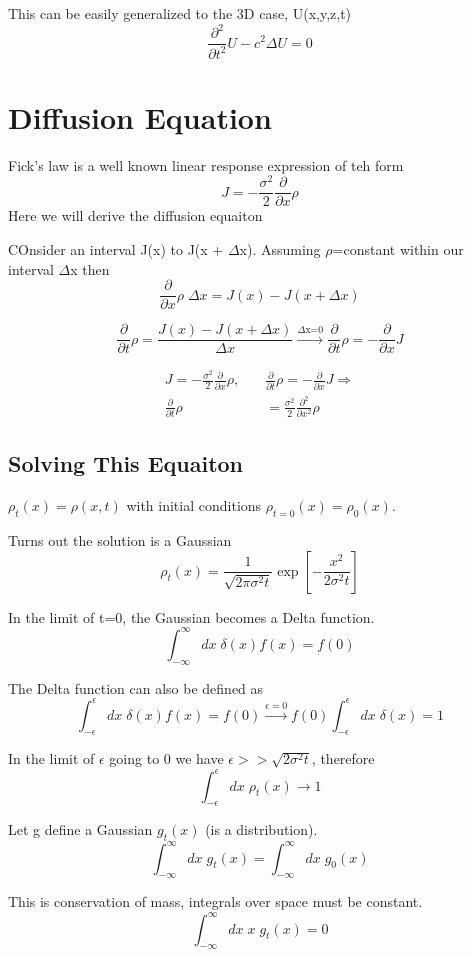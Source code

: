 \documentclass{article}
\newcommand{\be}{\begin{equation}}
\newcommand{\ee}{\end{equation}}
\newcommand{\pd}{\partial}
\newcommand{\ii}{\int_{-\infty}^\infty}
\newcommand{\prt}{\frac{\pd}{\pd t}}
\newcommand{\prts}{\frac{\pd^2}{\pd t^2}}
\newcommand{\prx}{\frac{\pd}{\pd x}}
\newcommand{\prxs}{\frac{\pd^2}{\pd x^2}}
\begin{document}
This can be easily generalized to the 3D case, U(x,y,z,t)
\be
\prts U - c^2 \Delta U = 0
\ee


\section{Diffusion Equation}
Fick's law is a well known linear response expression of teh form
\be
J = -\frac{\sigma^2}{2}\prx \rho
\ee
Here we will derive the diffusion equaiton

COnsider an interval J(x) to J(x + $\Delta$x).
Assuming $\rho$=constant within our interval $\Delta$x then
\be
\prx \rho\; \Delta x = J(x) - J(x+\Delta x)
\ee

\be
\prt \rho = \frac{J(x) - J(x+\Delta x)}{\Delta x} \xrightarrow{\text{$\Delta$x=0}} \prt \rho= -\prx J
\ee

\be
\begin{split}
    J = -\frac{\sigma^2}{2}\prx \rho, \quad&  \prt \rho= -\prx J \Rightarrow \\
    \prt \rho &= \frac{\sigma^2}{2}\prxs \rho
\end{split}
\ee

\subsection{Solving This Equaiton}
$\rho_t(x) =\rho(x,t)$ with initial conditions $\rho_{t=0}(x) = \rho_0(x)$.

Turns out the solution is a Gaussian
\be
\rho_t(x) = \frac{1}{\sqrt{2\pi \sigma^2t}} \exp\left[-\frac{x^2}{2\sigma^2t}\right]
\ee

In the limit of t=0, the Gaussian becomes a Delta function.
\be
\ii dx\; \delta(x)f(x) = f(0)
\ee


The Delta function can also be defined as
\be
\int_{-\epsilon}^\epsilon dx\; \delta(x)f(x) = f(0) \xrightarrow{\text{$\epsilon=0$}} f(0) \int_{-\epsilon}^\epsilon dx\; \delta(x) = 1
\ee

In the limit of $\epsilon$ going to 0 we have $\epsilon >> \sqrt{2\sigma^2t}$, therefore
\be
\int_{-\epsilon}^\epsilon dx\; \rho_t(x) \rightarrow 1
\ee

Let g define a Gaussian $g_t(x)$ (is a distribution).
\be
\ii dx\; g_t(x) = \ii dx \; g_0(x)
\ee

This is conservation of mass, integrals over space must be constant.
\be
\ii dx\; x\; g_t(x) = 0
\ee
\end{document}
